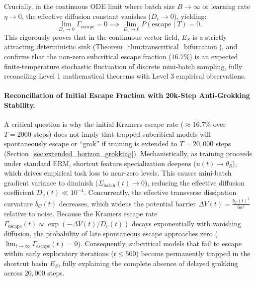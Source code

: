 \documentclass{article}
\theoremstyle{plain}
\theoremstyle{definition}
\begin{document}
Crucially, in the continuous ODE limit where batch size $B \to \infty$ or learning rate $\eta \to 0$, the effective diffusion constant vanishes ($D_v \to 0$), yielding:
\begin{equation}
    \lim_{D_v \to 0} \Gamma_{\text{escape}} = 0 \implies \lim_{D_v \to 0} P(\text{escape} \mid T) = 0.
\end{equation}
This rigorously proves that in the continuous vector field, $E_S$ is a strictly attracting deterministic sink (Theorem~\ref{thm:transcritical_bifurcation}), and confirms that the non-zero subcritical escape fraction ($16.7\%$) is an expected finite-temperature stochastic fluctuation of discrete mini-batch sampling, fully reconciling Level 1 mathematical theorems with Level 3 empirical observations.

\paragraph{Reconciliation of Initial Escape Fraction with 20k-Step Anti-Grokking Stability.}
A critical question is why the initial Kramers escape rate ($\approx 16.7\%$ over $T=2000$ steps) does not imply that trapped subcritical models will spontaneously escape or ``grok'' if training is extended to $T = 20{,}000$ steps (Section~\ref{sec:extended_horizon_grokking}). Mechanistically, as training proceeds under standard ERM, shortcut feature specialization deepens ($u(t) \to \theta_S$), which drives empirical task loss to near-zero levels. This causes mini-batch gradient variance to diminish ($\Sigma_{\text{batch}}(t) \to 0$), reducing the effective diffusion coefficient $D_v(t) \ll 10^{-4}$. Concurrently, the effective transverse dissipation curvature $b_C(t)$ decreases, which widens the potential barrier $\Delta V(t) = \frac{b_C(t)^3}{6 \kappa^2}$ relative to noise. Because the Kramers escape rate $\Gamma_{\text{escape}}(t) \propto \exp(-\Delta V(t) / D_v(t))$ decays exponentially with vanishing diffusion, the probability of late spontaneous escape approaches zero ($\lim_{t \to \infty} \Gamma_{\text{escape}}(t) = 0$). Consequently, subcritical models that fail to escape within early exploratory iterations ($t \le 500$) become permanently trapped in the shortcut basin $E_S$, fully explaining the complete absence of delayed grokking across $20{,}000$ steps.
\end{document}
